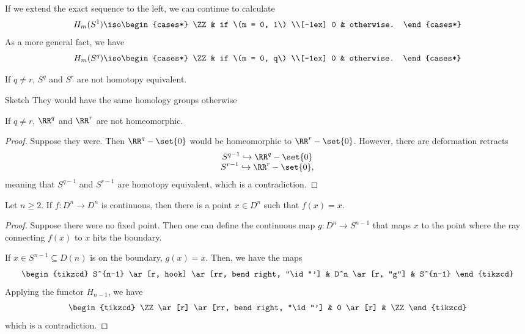 \documentclass{standalone}
\begin{document}
If we extend the exact sequence to the left, we can continue to calculate
\[
  H_m(S^1) \iso \begin{cases*}
    \ZZ & if \(m = 0, 1\) \\[-1ex]
    0   & otherwise.
  \end{cases*}
\]
As a more general fact, we have
\[
  H_m(S^q) \iso \begin{cases*}
    \ZZ & if \(m = 0, q\) \\[-1ex]
    0   & otherwise.
  \end{cases*}
\]


\begin{corollary}
  If \(q \neq r\), \(S^q\) and \(S^r\) are not homotopy equivalent.
\end{corollary}
\begin{proof*}{Sketch}
  They would have the same homology groups otherwise
\end{proof*}
\begin{corollary}
  If \(q \neq r\), \(\RR^q\) and \(\RR^r\) are not homeomorphic.
\end{corollary}
\begin{proof}
  Suppose they were. Then \(\RR^q - \set{0}\) would be homeomorphic to
  \(\RR^r - \set{0}\). However, there are deformation retracts
  \begin{gather*}
    S^{q-1} \hookrightarrow \RR^q - \set{0} \\[-1ex]
    S^{r-1} \hookrightarrow \RR^r - \set{0},
  \end{gather*}
  meaning that \(S^{q-1}\) and \(S^{r-1}\) are homotopy equivalent,
  which is a contradiction.
\end{proof}


\begin{theorem}
  Let \(n \geq 2\).
  If \(f \colon D^n \to D^n\) is continuous, then there is a point
  \(x \in D^n\) such that \(f(x) = x\).
\end{theorem}
\begin{proof}
  Suppose there were no fixed point. Then one can define the continuous map
  \(g \colon D^n \to S^{n-1}\) that maps \(x\) to the point where the ray
  connecting \(f(x)\) to \(x\) hits the boundary.
  
  If \(x \in S^{n-1} \subseteq D(n)\) is on the boundary, \(g(x) = x\).
  Then, we have the maps
  \[
    \begin{tikzcd}
    	S^{n-1} \ar[r, hook] \ar[rr, bend right, "\id"'] &
    	D^n \ar[r, "g"] &
    	S^{n-1}
    \end{tikzcd}
  \]
  Applying the functor \(H_{n-1}\), we have
  \[
    \begin{tikzcd}
    	\ZZ \ar[r] \ar[rr, bend right, "\id"'] &
    	0 \ar[r] &
    	\ZZ
    \end{tikzcd}
  \]
  which is a contradiction.
\end{proof}
\end{document}
